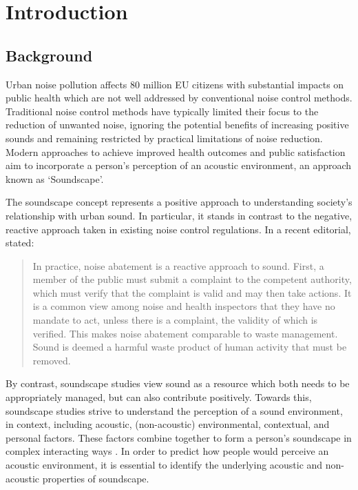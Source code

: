\chapter{Introduction}
\label{ch:intro}

\section{Background}
Urban noise pollution affects 80 million EU citizens with substantial impacts on public health which are not well addressed by conventional noise control methods. Traditional noise control methods have typically limited their focus to the reduction of unwanted noise, ignoring the potential benefits of increasing positive sounds and remaining restricted by practical limitations of noise reduction. Modern approaches to achieve improved health outcomes and public satisfaction aim to incorporate a person's perception of an acoustic environment, an approach known as `Soundscape'.

The soundscape concept represents a positive approach to understanding society's relationship with urban sound. In particular, it stands in contrast to the negative, reactive approach taken in existing noise control regulations. In a recent editorial, \citet{Axelsson2020Soundscape} stated:

\begin{quote}
  In practice, noise abatement is a reactive approach to sound. First, a member of the public must submit a complaint to the competent authority, which must verify that the complaint is valid and may then take actions. It is a common view among noise and health inspectors that they have no mandate to act, unless there is a complaint, the validity of which is verified. This makes noise abatement comparable to waste management. Sound is deemed a harmful waste product of human activity that must be removed.
\end{quote}

By contrast, soundscape studies view sound as a resource which both needs to be appropriately managed, but can also contribute positively. Towards this, soundscape studies strive to understand the perception of a sound environment, in context, including acoustic, (non-acoustic) environmental, contextual, and personal factors. These factors combine together to form a person's soundscape in complex interacting ways \citep{Berglund2006Tool}. In order to predict how people would perceive an acoustic environment, it is essential to identify the underlying acoustic and non-acoustic properties of soundscape.

